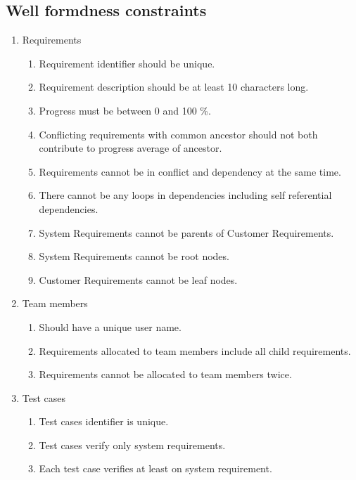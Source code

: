 \documentclass[11pt,a4paper]{scrartcl}
\begin{document}
\subsection{Well formdness constraints}
\begin{enumerate}
	\item Requirements
	\begin{enumerate}
		\item Requirement identifier should be unique.
		\item Requirement description should be at least 10 characters long.
		\item Progress must be between 0 and 100 \%.
		\item Conflicting requirements with common ancestor should not both contribute to progress average of ancestor.
		
		\item Requirements cannot be in conflict and dependency at the same time.
		
		\item There cannot be any loops in dependencies including self referential dependencies.
		
		\item System Requirements cannot be parents of Customer Requirements.
		\item System Requirements cannot be root nodes.
		\item Customer Requirements cannot be leaf nodes.
	\end{enumerate}
	
	\item Team members
	\begin{enumerate}
		\item Should have a unique user name.
		\item Requirements allocated to team members include all child requirements.
		\item Requirements cannot be allocated to team members twice.
	\end{enumerate}
	\item Test cases
	\begin{enumerate}
		\item Test cases identifier is unique.
		\item Test cases verify only system requirements.
		\item Each test case verifies at least on system requirement.
	\end{enumerate}
\end{enumerate}
\end{document}
